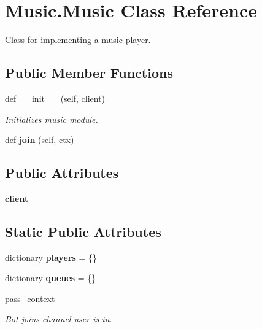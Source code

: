 \hypertarget{class_music_1_1_music}{}\section{Music.\+Music Class Reference}
\label{class_music_1_1_music}


Class for implementing a music player.  


\subsection*{Public Member Functions}
\begin{DoxyCompactItemize}
\item 
\mbox{\label{class_music_1_1_music_a89a364e50ecd80a583d3c114466337b7}} 
def \mbox{\hyperlink{class_music_1_1_music_a89a364e50ecd80a583d3c114466337b7}{\+\_\+\+\_\+init\+\_\+\+\_\+}} (self, client)
\begin{DoxyCompactList}\small\item\em Initializes music module. \end{DoxyCompactList}\item 
\mbox{\label{class_music_1_1_music_ad66f086a27a0b58f20d1b7ad2c53ae22}} 
def {\bfseries join} (self, ctx)
\end{DoxyCompactItemize}
\subsection*{Public Attributes}
\begin{DoxyCompactItemize}
\item 
\mbox{\label{class_music_1_1_music_ab010f59fba0ee5c65d02671c090472b1}} 
{\bfseries client}
\end{DoxyCompactItemize}
\subsection*{Static Public Attributes}
\begin{DoxyCompactItemize}
\item 
\mbox{\label{class_music_1_1_music_a6e27bea1793d75d46b2540fbae8d0dc5}} 
dictionary {\bfseries players} = \{\}
\item 
\mbox{\label{class_music_1_1_music_a00bd862f28dc50828138f72f9942444a}} 
dictionary {\bfseries queues} = \{\}
\item 
\mbox{\hyperlink{class_music_1_1_music_ab45fab6c44555d0360d31516d69c20d2}{pass\+\_\+context}}
\begin{DoxyCompactList}\small\item\em Bot joins channel user is in. \end{DoxyCompactList}\end{DoxyCompactItemize}


